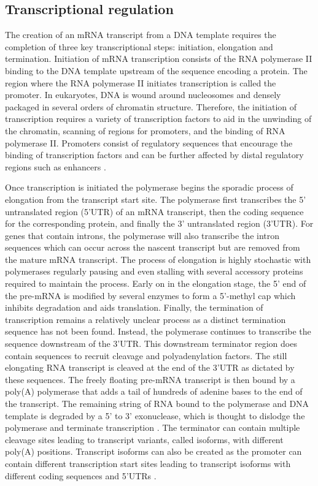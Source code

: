 \documentclass[../main.tex]{subfiles}
\begin{document}
\subsection{Transcriptional regulation}

The creation of an mRNA transcript from a DNA template requires the completion of three key transcriptional steps: initiation, elongation and termination.
Initiation of mRNA transcription consists of the RNA polymerase II binding to the DNA template upstream of the sequence encoding a protein.
The region where the RNA polymerase II initiates transcription is called the promoter.
In eukaryotes, DNA is wound around nucleosomes and densely packaged in several orders of chromatin structure.
Therefore, the initiation of transcription requires a variety of transcription factors to aid in the unwinding of the chromatin, scanning of regions for promoters, and the binding of RNA polymerase II.
Promoters consist of regulatory sequences that encourage the binding of transcription factors and can be further affected by distal regulatory regions such as enhancers \parencite{Cramer2019}. 

Once transcription is initiated the polymerase begins the sporadic process of elongation from the transcript start site.
The polymerase first transcribes the 5' untranslated region (5'UTR) of an mRNA transcript, then the coding sequence for the corresponding protein, and finally the 3' untranslated region (3'UTR).
For genes that contain introns, the polymerase will also transcribe the intron sequences which can occur across the nascent transcript but are removed from the mature mRNA transcript.  
The process of elongation is highly stochastic with polymerases regularly pausing and even stalling with several accessory proteins required to maintain the process.
Early on in the elongation stage, the 5' end of the pre-mRNA is modified by several enzymes to form a 5'-methyl cap which inhibits degradation and aids translation.
Finally, the termination of transcription remains a relatively unclear process as a distinct termination sequence has not been found.
Instead, the polymerase continues to transcribe the sequence downstream of the 3'UTR.
This downstream terminator region does contain sequences to recruit cleavage and polyadenylation factors.
The still elongating RNA transcript is cleaved at the end of the 3'UTR as dictated by these sequences.
The freely floating pre-mRNA transcript is then bound by a poly(A) polymerase that adds a tail of hundreds of adenine bases to the end of the transcript.
The remaining string of RNA bound to the polymerase and DNA template is degraded by a 5' to 3' exonuclease, which is thought to dislodge the polymerase and terminate transcription \parencite{Alberts2017,Cramer2019}.
The terminator can contain multiple cleavage sites leading to transcript variants, called isoforms, with different poly(A) positions.
Transcript isoforms can also be created as the promoter can contain different transcription start sites leading to transcript isoforms with different coding sequences and 5'UTRs \parencite{Klerk2015}.
\end{document}

